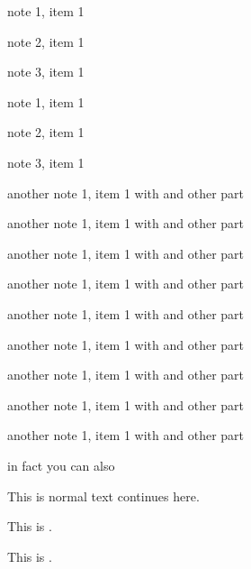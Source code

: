 \documentclass[12pt]{article}
\begin{document}
\makeDocumentTitle

\note
    \itemGap
    \item note 1, item 1
    \note
        \item note 2, item 1
        \note
            \item note 3, item 1
        \xNote
    \xNote
    \flatnote
        \item note 1, item 1
        \note
            \item note 2, item 1
            \note
                \item note 3, item 1
            \xNote
        \xNote
    \xFlatnote
\xNote

\note
    \itemGap
    \item another note 1, item 1 with  and other part
    \item another note 1, item 1 with  and other part
    \item another note 1, item 1 with  and other part
    \item another note 1, item 1 with  and other part
    \item another note 1, item 1 with  and other part
    \item another note 1, item 1 with  and other part
    \item another note 1, item 1 with  and other part
    \item another note 1, item 1 with  and other part
    \item another note 1, item 1 with  and other part
    \item in fact you can also 
\xNote

\newpage
{}

\begin{blockPinkSolidRegular}
\note
    \item This is normal text  continues here.
    \item This is .
    \item This is .
\xNote
\end{blockPinkSolidRegular}
\end{document}
